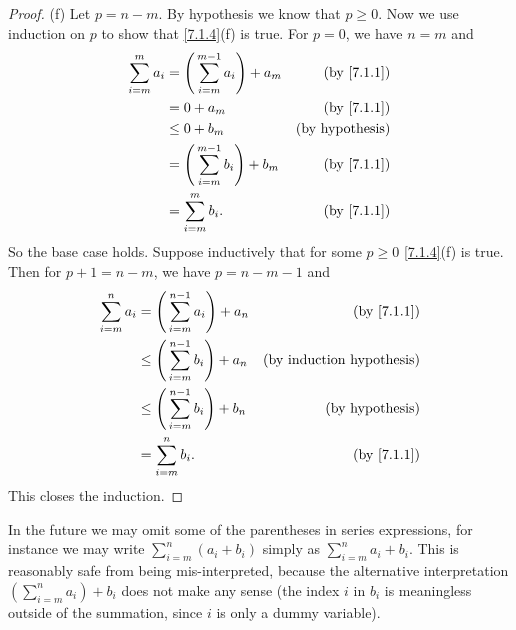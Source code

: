 \begin{proof}{(f)}
  Let \(p = n - m\).
  By hypothesis we know that \(p \geq 0\).
  Now we use induction on \(p\) to show that \cref{7.1.4}(f) is true.
  For \(p = 0\), we have \(n = m\) and
  \begin{align*}
    \sum_{i = m}^m a_i & = \Bigg(\sum_{i = m}^{m - 1} a_i\Bigg) + a_m & \text{(by \cref{7.1.1})} \\
                       & = 0 + a_m                                    & \text{(by \cref{7.1.1})} \\
                       & \leq 0 + b_m                                 & \text{(by hypothesis)}   \\
                       & = \Bigg(\sum_{i = m}^{m - 1} b_i\Bigg) + b_m & \text{(by \cref{7.1.1})} \\
                       & = \sum_{i = m}^m b_i.                        & \text{(by \cref{7.1.1})} \\
  \end{align*}
  So the base case holds.
  Suppose inductively that for some \(p \geq 0\) \cref{7.1.4}(f) is true.
  Then for \(p + 1 = n - m\), we have \(p = n - m - 1\) and
  \begin{align*}
    \sum_{i = m}^n a_i & = \Bigg(\sum_{i = m}^{n - 1} a_i\Bigg) + a_n    & \text{(by \cref{7.1.1})}         \\
                       & \leq \Bigg(\sum_{i = m}^{n - 1} b_i\Bigg) + a_n & \text{(by induction hypothesis)} \\
                       & \leq \Bigg(\sum_{i = m}^{n - 1} b_i\Bigg) + b_n & \text{(by hypothesis)}           \\
                       & = \sum_{i = m}^n b_i.                           & \text{(by \cref{7.1.1})}         \\
  \end{align*}
  This closes the induction.
\end{proof}

\begin{remark}\label{7.1.5}
  In the future we may omit some of the parentheses in series expressions, for instance we may write \(\sum_{i = m}^n (a_i + b_i)\) simply as \(\sum_{i = m}^n a_i + b_i\).
  This is reasonably safe from being mis-interpreted, because the alternative interpretation \((\sum_{i = m}^n a_i) + b_i\) does not make any sense
  (the index \(i\) in \(b_i\) is meaningless outside of the summation, since \(i\) is only a dummy variable).
\end{remark}

